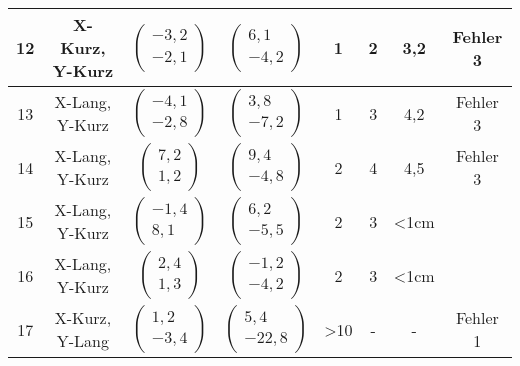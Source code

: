 \begin{appendix}
\begin{center}
\begin{longtable}{|c|c|c|c|c|c|c|c|}
    		\hline
    		12 & X-Kurz, Y-Kurz &  $\left(\begin{array}{c} -3,2 \\ -2,1\end{array}\right)$ & $\left(\begin{array}{c} 6,1 \\ -4,2\end{array}\right)$ & 1& 2& 3,2& Fehler 3\\
    		\hline
    		13 & X-Lang, Y-Kurz &  $\left(\begin{array}{c} -4,1 \\ -2,8\end{array}\right)$ & $\left(\begin{array}{c} 3,8 \\ -7,2\end{array}\right)$ & 1& 3& 4,2& Fehler 3\\
    		\hline
    		14 & X-Lang, Y-Kurz &  $\left(\begin{array}{c} 7,2 \\ 1,2\end{array}\right)$ & $\left(\begin{array}{c} 9,4 \\ -4,8\end{array}\right)$ & 2& 4& 4,5& Fehler 3\\
    		\hline
    		15 & X-Lang, Y-Kurz &  $\left(\begin{array}{c} -1,4 \\ 8,1\end{array}\right)$ & $\left(\begin{array}{c} 6,2 \\ -5,5\end{array}\right)$ & 2& 3& <1cm& \checkmark\\
    		\hline
    		16 & X-Lang, Y-Kurz &  $\left(\begin{array}{c} 2,4 \\ 1,3\end{array}\right)$ & $\left(\begin{array}{c} -1,2 \\ -4,2\end{array}\right)$ & 2& 3& <1cm& \checkmark\\
    		\hline
    		17 & X-Kurz, Y-Lang &  $\left(\begin{array}{c} 1,2 \\ -3,4\end{array}\right)$ & $\left(\begin{array}{c} 5,4 \\ -22,8\end{array}\right)$ & >10& -&- & Fehler 1\\

\end{longtable}
\end{center}
\end{appendix}
